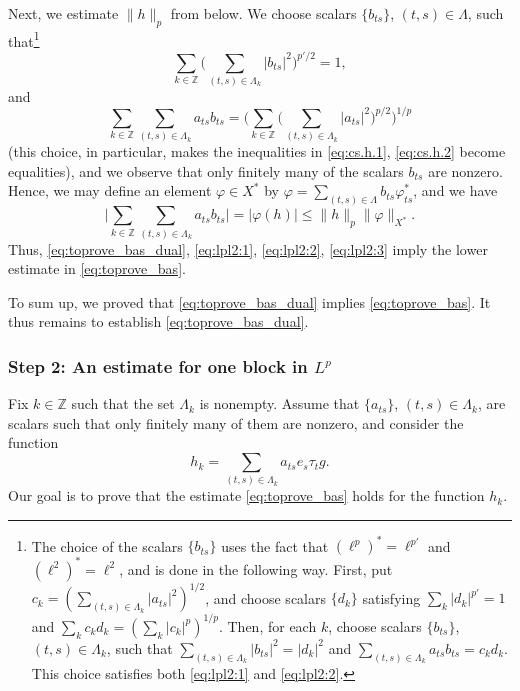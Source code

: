 \documentclass[reqno,a4paper,12pt]{amsart}
\numberwithin{equation}{section}
\numberwithin{figure}{section}
\newcommand\Z{\mathbb{Z}}
\newcommand\Lam{\Lambda}
\newcommand\1{\mathds{1}}
\newcommand{\pphi}{\varphi}
\newcommand{\ts}{\tau}
\renewcommand\le{\leqslant}
\theoremstyle{plain}
\theoremstyle{definition}
\begin{document}
Next, we estimate $\|h\|_p$ from below. 
We choose scalars $\{b_{ts}\}$, $(t,s)\in \Lambda$, such 
that\footnote{The choice of the scalars $\{b_{ts}\}$ 
uses the fact that $ (\ell^p)^* = \ell^{p'} $
and $ (\ell^2)^*   = \ell^{2} $, and is done in
the following way. First,  put 
$c_k = ( \sum_{(t,s) \in \Lam_k} |a_{ts}|^2 )^{1/2}$, and
 choose scalars $\{d_k\}$ satisfying $\sum_k |d_k|^{p'} = 1$ and 
$\sum_k c_k d_k  = ( \sum_k |c_k|^p )^{1/p}$.
Then,   for each $k$, 
 choose scalars $\{b_{ts}\}$, $(t,s) \in \Lam_k$, 
such that $  \sum_{(t,s) \in \Lam_k} |b_{ts}|^2  = |d_k|^2$
and $ \sum_{(t,s) \in \Lam_k} a_{ts} b_{ts} = c_k d_k$.
This choice satisfies both \eqref{eq:lpl2:1} and \eqref{eq:lpl2:2}.} 
\begin{equation}
\label{eq:lpl2:1}
 \sum_{k \in \Z} \Big( \sum_{(t,s)\in\Lambda_k}  |b_{ts}|^2 \Big)^{p'/2} = 1,
\end{equation}
and
\begin{equation}
\label{eq:lpl2:2}
 \sum_{k \in \Z} \sum_{(t,s)\in\Lambda_k}  a_{ts} b_{ts} =
 \Big( \sum_{k \in \Z} \Big( \sum_{(t,s)\in\Lambda_k}  |a_{ts}|^2 \Big)^{p/2} \Big)^{1/p}
\end{equation}
(this choice, in particular, makes the inequalities in
\eqref{eq:cs.h.1}, \eqref{eq:cs.h.2} become equalities),
and we observe that only finitely many of the scalars $b_{ts}$  are nonzero.
Hence, we may define an element $\pphi \in X^*$ by
 $\pphi = \sum_{(t,s)\in\Lambda}  b_{ts} \pphi_{ts}^*$, and we have
\begin{equation}
\label{eq:lpl2:3}
 \Big| \sum_{k \in \Z} \sum_{(t,s)\in\Lambda_k}  a_{ts} b_{ts} \Big|
 = |\pphi(h)|  \le \|h\|_p \|\pphi \|_{X^*}.
\end{equation}
Thus, \eqref{eq:toprove_bas_dual}, 
\eqref{eq:lpl2:1}, \eqref{eq:lpl2:2}, \eqref{eq:lpl2:3}
imply the lower estimate in \eqref{eq:toprove_bas}.

To sum up, we proved that \eqref{eq:toprove_bas_dual} implies \eqref{eq:toprove_bas}.
It thus remains to establish \eqref{eq:toprove_bas_dual}.


\subsubsection{Step 2: An estimate for one block in $L^p$}
Fix $k\in\Z$ such that the set $\Lambda_k$ is nonempty.
Assume that $\{  a_{ts} \}$, $(t,s)\in\Lambda_k$, 
are scalars such that only finitely many of them are nonzero,
and consider the function
\begin{equation}\label{eq:hk}
h_{k} =  \sum_{(t,s)\in\Lambda_k}  a_{ts} e_s \ts_t g.
\end{equation}
Our goal is to prove that the estimate
 \eqref{eq:toprove_bas} holds for the function
 $h_k$.
 
\end{document}

